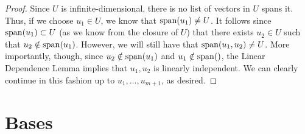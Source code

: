\documentclass[../main.tex]{subfiles}
\begin{document}
\begin{itemize}
\begin{theorem}
\begin{proof}
            Since $U$ is infinite-dimensional, there is no list of vectors in $U$ spans it. Thus, if we choose $u_1\in U$, we know that $\operatorname{span}(u_1)\neq U$. It follows since $\operatorname{span}(u_1)\subset U$ (as we know from the closure of $U$) that there exists $u_2\in U$ such that $u_2\notin\operatorname{span}(u_1)$. However, we will still have that $\operatorname{span}(u_1,u_2)\neq U$. More importantly, though, since $u_2\notin\operatorname{span}(u_1)$ and $u_1\notin\operatorname{span}()$, the Linear Dependence Lemma implies that $u_1,u_2$ is linearly independent. We can clearly continue in this fashion up to $u_1,\dots,u_{m+1}$, as desired.
        \end{proof}
    \end{theorem}
\end{itemize}



\section{Bases}
\end{document}
